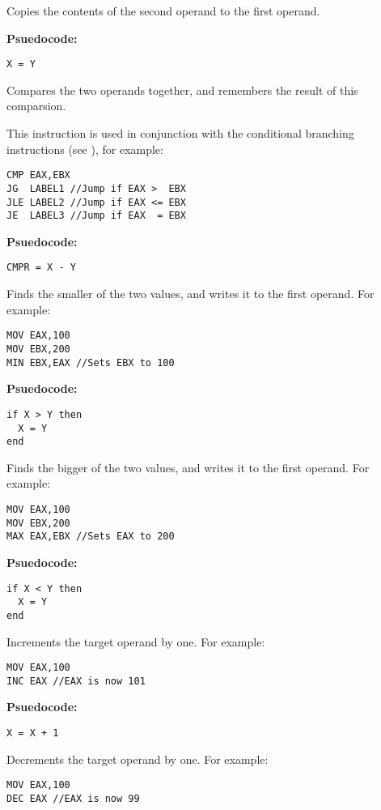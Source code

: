 Copies the contents of the second operand to the first operand.

\textbf{Psuedocode:}
\begin{verbatim}
X = Y
\end{verbatim}


Compares the two operands together, and remembers the result of this comparsion.

This instruction is used in conjunction with the conditional branching instructions (see \pageref{branching}), for example:
\begin{verbatim}
CMP EAX,EBX
JG  LABEL1 //Jump if EAX >  EBX
JLE LABEL2 //Jump if EAX <= EBX
JE  LABEL3 //Jump if EAX  = EBX
\end{verbatim}

\textbf{Psuedocode:}
\begin{verbatim}
CMPR = X - Y
\end{verbatim}


Finds the smaller of the two values, and writes it to the first operand. For example:
\begin{verbatim}
MOV EAX,100
MOV EBX,200
MIN EBX,EAX //Sets EBX to 100
\end{verbatim}

\textbf{Psuedocode:}
\begin{verbatim}
if X > Y then
  X = Y
end
\end{verbatim}


Finds the bigger of the two values, and writes it to the first operand. For example:
\begin{verbatim}
MOV EAX,100
MOV EBX,200
MAX EAX,EBX //Sets EAX to 200
\end{verbatim}

\textbf{Psuedocode:}
\begin{verbatim}
if X < Y then
  X = Y
end
\end{verbatim}


Increments the target operand by one. For example:
\begin{verbatim}
MOV EAX,100
INC EAX //EAX is now 101
\end{verbatim}

\textbf{Psuedocode:}
\begin{verbatim}
X = X + 1
\end{verbatim}


Decrements the target operand by one. For example:
\begin{verbatim}
MOV EAX,100
DEC EAX //EAX is now 99
\end{verbatim}

